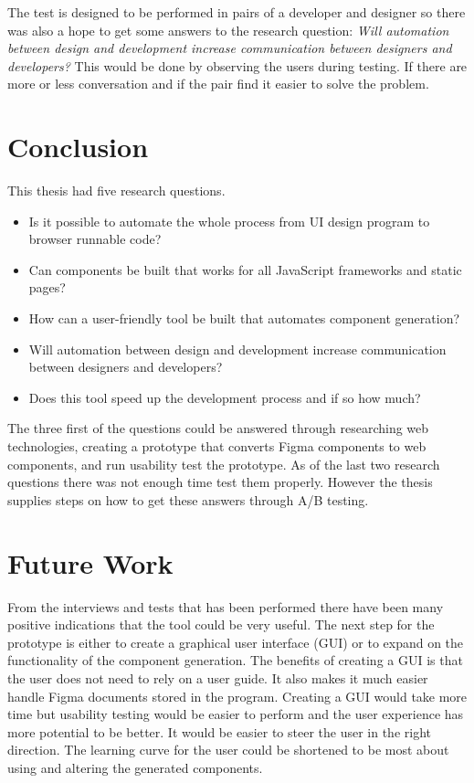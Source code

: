 The test is designed to be performed in pairs of a developer and designer so there was also a hope to get some answers to the research question: \textit{Will automation between design and development increase communication between designers and developers?} This would be done by observing the users during testing. If there are more or less conversation and if the pair find it easier to solve the problem.

\newpage
\section{Conclusion}
\label{sub:conclusion}
This thesis had five research questions.  
\begin{itemize}
  \item Is it possible to automate the whole process from UI design program to browser runnable code? 
 \item Can components be built that works for all JavaScript frameworks and static pages?
  \item How can a user-friendly tool be built that automates component generation?  
  \item Will automation between design and development increase communication between designers and developers?
  \item Does this tool speed up the development process and if so how much?
\end{itemize}

The three first of the questions could be answered through researching web technologies, creating a prototype that converts Figma components to web components, and run usability test the prototype. As of the last two research questions there was not enough time test them properly. However the thesis supplies steps on how to get these answers through A/B testing.



\section{Future Work}%
\label{sub:Future Work}

From the interviews and tests that has been performed there have been many positive indications that the tool could be very useful. The next step for the prototype is either to create a graphical user interface (GUI) or to expand on the functionality of the component generation. The benefits of creating a GUI is that the user does not need to rely on a user guide. It also makes it much easier handle Figma documents stored in the program. Creating a GUI would take more time but usability testing would be easier to perform and the user experience has more potential to be better. It would be easier to steer the user in the right direction. The learning curve for the user could be shortened to be most about using and altering the generated components. 

